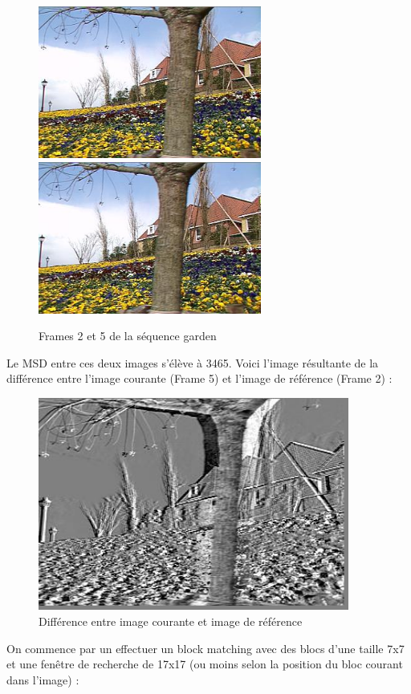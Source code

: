 \documentclass[a4paper, 12pt]{article}
\begin{document}
\begin{figure}[H]
	\centering
	\includegraphics[height=5cm]{../garden1.jpg}
	\includegraphics[height=5cm]{../garden2.jpg}
	\caption{Frames 2 et 5 de la séquence garden}
	\label{fig:garden}
\end{figure}

Le MSD entre ces deux images s'élève à 3465. Voici l'image résultante de la différence entre l'image courante (Frame 5) et l'image de référence (Frame 2) :

\begin{figure}[H]
	\centering
	\includegraphics[height=7cm]{../Resultats/Garden/garden_error.jpg}
	\caption{Différence entre image courante et image de référence}
	\label{fig:garden_error}
\end{figure}

On commence par un effectuer un block matching avec des blocs d'une taille 7x7 et une fenêtre de recherche de 17x17 (ou moins selon la position du bloc courant dans l'image) :
\end{document}
